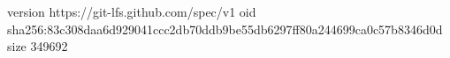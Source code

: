 version https://git-lfs.github.com/spec/v1
oid sha256:83c308daa6d929041ccc2db70ddb9be55db6297ff80a244699ca0c57b8346d0d
size 349692
